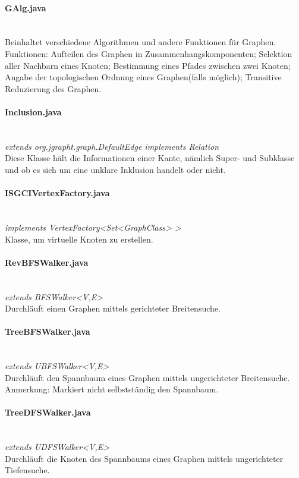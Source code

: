 \documentclass[10pt,a4paper]{article}
\begin{document}
\paragraph{GAlg.java}\ \\
Beinhaltet verschiedene Algorithmen und andere Funktionen für Graphen.\\
Funktionen: Aufteilen des Graphen in Zusammenhangskomponenten; Selektion aller Nachbarn eines Knoten; Bestimmung eines Pfades zwischen zwei Knoten; Angabe der topologischen Ordnung eines Graphen(falls möglich); Transitive Reduzierung des Graphen.\\

\paragraph{Inclusion.java}\ \\
\emph{extends org.jgrapht.graph.DefaultEdge
        implements Relation}\\
Diese Klasse hält die Informationen einer Kante, nämlich Super- und Subklasse und ob es sich um eine unklare Inklusion handelt oder nicht.\\
\paragraph{ISGCIVertexFactory.java}\ \\
\emph{ implements VertexFactory<Set<GraphClass> >}\\
Klasse, um virtuelle Knoten zu erstellen.\\
\paragraph{RevBFSWalker.java}\ \\
\emph{extends BFSWalker<V,E>}\\
Durchläuft einen Graphen mittels gerichteter Breitensuche.\
\paragraph{TreeBFSWalker.java}\ \\
\emph{ extends UBFSWalker<V,E>}\\
Durchläuft den Spannbaum eines Graphen mittels ungerichteter Breitensuche. Anmerkung: Markiert nicht selbstständig den Spannbaum.\\
\paragraph{TreeDFSWalker.java}\ \\
\emph{extends UDFSWalker<V,E>}\\
Durchläuft die Knoten des Spannbaums eines Graphen mittels ungerichteter Tiefensuche.\\
\end{document}
